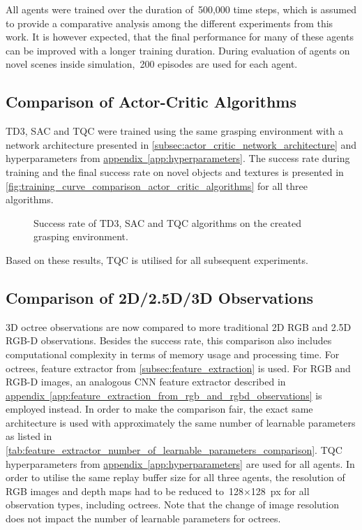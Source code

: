 All agents were trained over the duration of~500,000 time steps, which is assumed to provide a comparative analysis among the different experiments from this work. It is however expected, that the final performance for many of these agents can be improved with a longer training duration. During evaluation of agents on novel scenes inside simulation,~200 episodes are used for each agent.


\subsection{Comparison of Actor-Critic Algorithms}

TD3, SAC and TQC were trained using the same grasping environment with a network architecture presented in \autoref{subsec:actor_critic_network_architecture} and hyperparameters from \hyperref[app:hyperparameters]{appendix~\ref*{app:hyperparameters}}. The success rate during training and the final success rate on novel objects and textures is presented in \autoref{fig:training_curve_comparison_actor_critic_algorithms} for all three algorithms.

\begin{figure}[ht]
    \centering
    \caption{Success rate of TD3, SAC and TQC algorithms on the created grasping environment.}
    \label{fig:training_curve_comparison_actor_critic_algorithms}
\end{figure}

Based on these results, TQC is utilised for all subsequent experiments.


\subsection{Comparison of 2D/2.5D/3D Observations}\label{subsec:comparison_of_2d_2_5d_3d_observations}

3D octree observations are now compared to more traditional 2D RGB and 2.5D RGB-D observations. Besides the success rate, this comparison also includes computational complexity in terms of memory usage and processing time. For octrees, feature extractor from \autoref{subsec:feature_extraction} is used. For RGB and RGB-D images, an analogous CNN feature extractor described in \hyperref[app:feature_extraction_from_rgb_and_rgbd_observations]{appendix~\ref*{app:feature_extraction_from_rgb_and_rgbd_observations}} is employed instead.  In order to make the comparison fair, the exact same architecture is used with approximately the same number of learnable parameters as listed in \autoref{tab:feature_extractor_number_of_learnable_parameters_comparison}. TQC hyperparameters from \hyperref[app:hyperparameters]{appendix~\ref*{app:hyperparameters}} are used for all agents. In order to utilise the same replay buffer size for all three agents, the resolution of RGB images and depth maps had to be reduced to~128\({\times}\)128~px for all observation types, including octrees. Note that the change of image resolution does not impact the number of learnable parameters for octrees.

